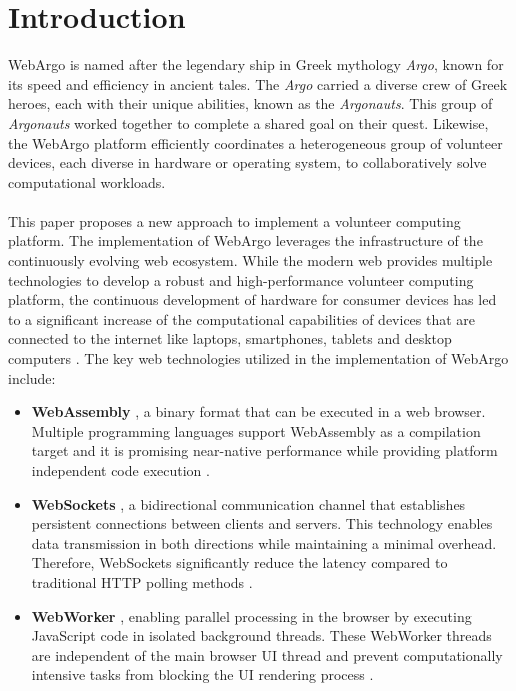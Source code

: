 \chapter{Introduction}
\label{ch:intro}
WebArgo is named after the legendary ship in Greek mythology \emph{Argo}, known for its speed and efficiency in ancient tales. The \emph{Argo} carried a diverse crew of Greek heroes, each with their unique abilities, known as the \emph{Argonauts}. This group of \emph{Argonauts} worked together to complete a shared goal on their quest. Likewise, the WebArgo platform efficiently coordinates a heterogeneous group of volunteer devices, each diverse in hardware or operating system, to collaboratively solve computational workloads.
\\~\\
This paper proposes a new approach to implement a volunteer computing platform. The implementation of WebArgo leverages the infrastructure of the continuously evolving web ecosystem. While the modern web provides multiple technologies to develop a robust and high-performance volunteer computing platform, the continuous development of hardware for consumer devices has led to a significant increase of the computational capabilities of devices that are connected to the internet like laptops, smartphones, tablets and desktop computers \cite{relatedwork:mobilecloud, relatedwork:wasmedgecomputing}. The key web technologies utilized in the implementation of WebArgo include:
\begin{itemize}
    \item \textbf{WebAssembly} \cite{methodology:wasmW3C}, a binary format that can be executed in a web browser. Multiple programming languages support WebAssembly as a compilation target and it is promising near-native performance while providing platform independent code execution \cite{methodology:wasm, methodology:wasmW3C}.
    \item \textbf{WebSockets} \cite{methodology:websockets1}, a bidirectional communication channel that establishes persistent connections between clients and servers. This technology enables data transmission in both directions while maintaining a minimal overhead. Therefore, WebSockets significantly reduce the latency compared to traditional \acs{HTTP} polling methods \cite{methodology:websockets3}. 
    \item \textbf{WebWorker} \cite{methodology:webworkers}, enabling parallel processing in the browser by executing JavaScript code in isolated background threads. These WebWorker threads are independent of the main browser \ac{UI} thread and prevent computationally intensive tasks from blocking the \ac{UI} rendering process \cite{methodology:webworkers}.
\end{itemize}
